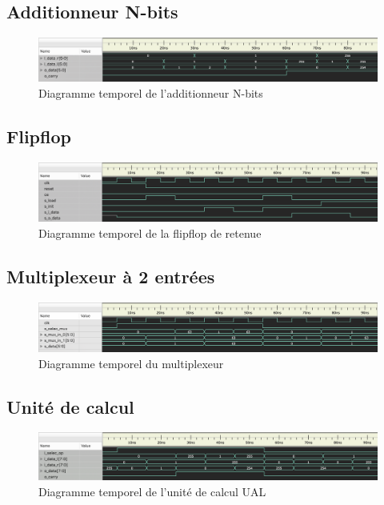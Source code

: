 \documentclass{article}
\begin{document}
    \subsection{Additionneur N-bits}
    \begin{figure}[h]
        \centering
        \includegraphics[width=\textwidth]{../doc/tb_screen/addi_n_bits.png}
        \caption{Diagramme temporel de l'additionneur N-bits}
        \label{fig:diag_tb_addi_n_bits}
    \end{figure}

    \subsection{Flipflop}
    \begin{figure}[h]
        \centering
        \includegraphics[width=\textwidth]{../doc/tb_screen/flipflop.png}
        \caption{Diagramme temporel de la flipflop de retenue}
        \label{fig:diag_tb_flipflop}
    \end{figure}

    \subsection{Multiplexeur à 2 entrées}
    \begin{figure}[h]
        \centering
        \includegraphics[width=\textwidth]{../doc/tb_screen/mux_2_in.png}
        \caption{Diagramme temporel du multiplexeur}
        \label{fig:diag_tb_mux_2_in}
    \end{figure}

    \subsection{Unité de calcul}
    \begin{figure}[h]
        \centering
        \includegraphics[width=\textwidth]{../doc/tb_screen/ual.png}
        \caption{Diagramme temporel de l'unité de calcul UAL}
        \label{fig:diag_tb_ual}
    \end{figure}
\end{document}
